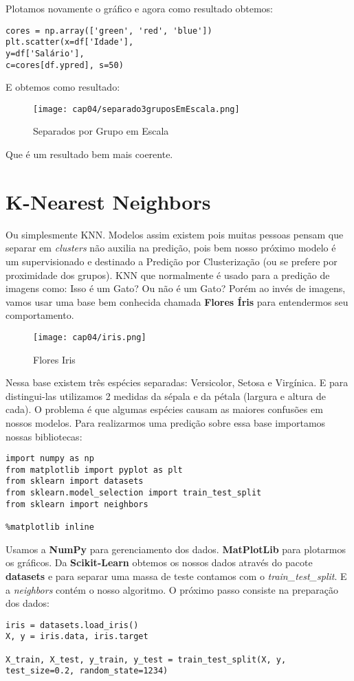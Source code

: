 Plotamos novamente o gráfico e agora como resultado obtemos:
\begin{lstlisting}[]
cores = np.array(['green', 'red', 'blue'])
plt.scatter(x=df['Idade'],
y=df['Salário'],
c=cores[df.ypred], s=50)
\end{lstlisting}

E obtemos como resultado:
\begin{figure}[H]
	\centering
	\texttt{[image: cap04/separado3gruposEmEscala.png]}
	\caption{Separados por Grupo em Escala}
\end{figure}

Que é um resultado bem mais coerente.

\section{K-Nearest Neighbors}
Ou simplesmente KNN. Modelos assim existem pois muitas pessoas pensam que separar em \textit{clusters} não auxilia na predição, pois bem nosso próximo modelo é um supervisionado e destinado a Predição por Clusterização (ou se prefere por proximidade dos grupos). KNN que normalmente é usado para a predição de imagens como: Isso é um Gato? Ou não é um Gato? Porém ao invés de imagens, vamos usar uma base bem conhecida chamada \textbf{Flores Íris} para entendermos seu comportamento. 
\begin{figure}[H]
	\centering
	\texttt{[image: cap04/iris.png]}
	\caption{Flores Iris}
\end{figure}

Nessa base existem três espécies separadas: Versicolor, Setosa e Virgínica. E para distingui-las utilizamos 2 medidas da sépala e da pétala (largura e altura de cada). O problema é que algumas espécies causam as maiores confusões em nossos modelos. Para realizarmos uma predição sobre essa base importamos nossas bibliotecas:
\begin{lstlisting}[]
import numpy as np
from matplotlib import pyplot as plt
from sklearn import datasets
from sklearn.model_selection import train_test_split
from sklearn import neighbors

%matplotlib inline
\end{lstlisting}

Usamos a \textbf{NumPy} para gerenciamento dos dados. \textbf{MatPlotLib} para plotarmos os gráficos. Da \textbf{Scikit-Learn} obtemos os nossos dados através do pacote \textbf{datasets} e para separar uma massa de teste contamos com o \textit{train\_test\_split}. E a \textit{neighbors} contém o nosso algoritmo. O próximo passo consiste na preparação dos dados:
\begin{lstlisting}[]
iris = datasets.load_iris()
X, y = iris.data, iris.target

X_train, X_test, y_train, y_test = train_test_split(X, y, test_size=0.2, random_state=1234)
\end{lstlisting}

